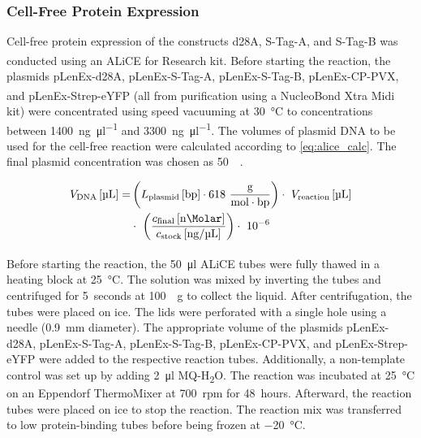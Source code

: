 \subsubsection{Cell-Free Protein Expression}
Cell-free protein expression of the constructs d28A, S-Tag-A, and S-Tag-B was conducted using an ALiCE\textsuperscript{\textregistered} for Research kit. Before starting the reaction, the plasmids pLenEx-d28A, pLenEx-S-Tag-A, pLenEx-S-Tag-B, pLenEx-CP-PVX, and pLenEx-Strep-eYFP (all from purification using a NucleoBond\textsuperscript{\textregistered} Xtra Midi kit) were concentrated using speed vacuuming at \SI{30}{\degreeCelsius} to concentrations between \SI{1400}{\nano\gram\per\micro\litre} and \SI{3300}{\nano\gram\per\micro\litre}. The volumes of plasmid DNA to be used for the cell-free reaction were calculated according to \autoref{eq:alice_calc}. The final plasmid concentration was chosen as \SI{50}{\nano\Molar}. 

\begin{align}
    \label{eq:alice_calc}
    \begin{split}
V_{\text{DNA}}\, [\si{\micro\liter}] =&\left( L_{\text{plasmid}}\, [\text{bp}] \cdot 618\ \frac{\text{g}}{\text{mol} \cdot \text{bp}} \right) \cdot\ V_{\text{reaction}}\, [\si{\micro\liter}] \\
& \cdot\ \left( \frac{c_{\text{final}}\, [\si{\nano\Molar}]}{c_{\text{stock}}\, [\si{\nano\gram}/\si{\micro\liter}]} \right) \cdot\ 10^{-6}
    \end{split}
\end{align}

Before starting the reaction, the \SI{50}{\micro\litre} ALiCE\textsuperscript{\textregistered} tubes were fully thawed in a heating block at \SI{25}{\degreeCelsius}. The solution was mixed by inverting the tubes and centrifuged for 5~seconds at \SI{100}{\times g} to collect the liquid. After centrifugation, the tubes were placed on ice. The lids were perforated with a single hole using a needle (\SI{0.9}{\milli\meter} diameter). The appropriate volume of the plasmids pLenEx-d28A, pLenEx-S-Tag-A, pLenEx-S-Tag-B, pLenEx-CP-PVX, and pLenEx-Strep-eYFP were added to the respective reaction tubes. Additionally, a non-template control was set up by adding \SI{2}{\micro\litre} MQ-H\textsubscript{2}O. The reaction was incubated at \SI{25}{\degreeCelsius} on an Eppendorf ThermoMixer at \SI{700}{rpm} for 48~hours. Afterward, the reaction tubes were placed on ice to stop the reaction. The reaction mix was transferred to low protein-binding tubes before being frozen at \SI{-20}{\degreeCelsius}. 

